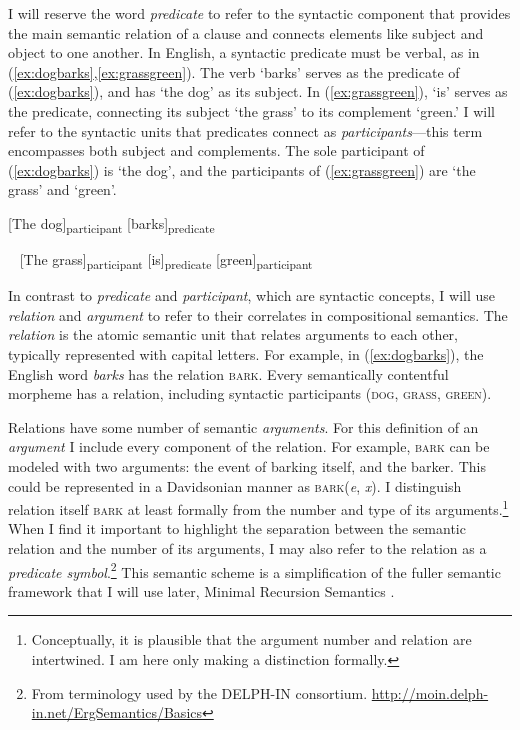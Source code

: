 I will reserve the word \textit{predicate} to refer to the syntactic component that provides the main semantic relation of a clause and connects elements like subject and object to one another. In English, a syntactic predicate must be verbal, as in (\ref{ex:dogbarks},\ref{ex:grassgreen}). The verb `barks' serves as the predicate of (\ref{ex:dogbarks}), and has `the dog' as its subject. In (\ref{ex:grassgreen}), `is' serves as the predicate, connecting its subject `the grass' to its complement `green.' I will refer to the syntactic units that predicates connect as \textit{participants}---this term encompasses both subject and complements. The sole participant of (\ref{ex:dogbarks}) is `the dog', and the participants of (\ref{ex:grassgreen}) are `the grass' and `green'.

\ex \label{ex:dogbarks}
[The dog]\textsubscript{participant} [barks]\textsubscript{predicate}
\xe

\ex~ \label{ex:grassgreen}
[The grass]\textsubscript{participant} [is]\textsubscript{predicate} [green]\textsubscript{participant}
\xe

In contrast to \textit{predicate} and \textit{participant}, which are syntactic concepts, I will use \textit{relation} and \textit{argument} to refer to their correlates in compositional semantics. The \textit{relation} is the atomic semantic unit that relates arguments to each other, typically represented with capital letters. For example, in (\ref{ex:dogbarks}), the English word \textit{barks} has the relation \textsc{bark}. Every semantically contentful morpheme has a relation, including syntactic participants (\textsc{dog}, \textsc{grass}, \textsc{green}).

Relations have some number of semantic \textit{arguments}. For this definition of an \textit{argument} I include every component of the relation. For example, \textsc{bark} can be modeled with two arguments: the event of barking itself, and the barker. This could be represented in a Davidsonian manner \citep{davidson1967} as \textsc{bark}(\textit{e}, \textit{x}). I distinguish relation itself \textsc{bark} at least formally from the number and type of its arguments.\footnote{Conceptually, it is plausible that the argument number and relation are intertwined. I am here only making a distinction formally.} When I find it important to highlight the separation between the semantic relation and the number of its arguments, I may also refer to the relation as a \textit{predicate symbol}.\footnote{From terminology used by the DELPH-IN consortium. \url{http://moin.delph-in.net/ErgSemantics/Basics}} This semantic scheme is a simplification of the fuller semantic framework that I will use later, Minimal Recursion Semantics \citep{copestake2005}.

